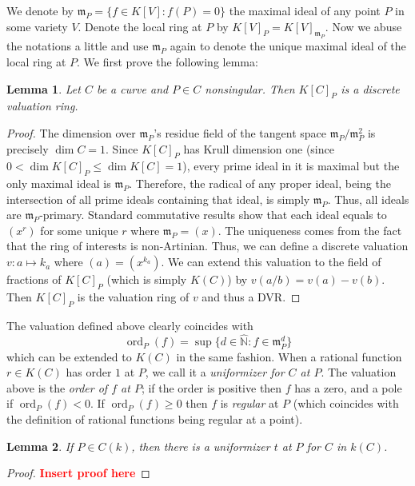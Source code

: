 \documentclass[12pt]{article}
\newtheorem{lemma}{Lemma}[subsection]
\theoremstyle{remark}
\newcommand{\ord}[0]{\operatorname{ord}}
\begin{document}
        We denote by $\mathfrak m_P=\{f\in K[V]:f(P)=0\}$ the maximal ideal of any point $P$ in some variety $V$. Denote the local ring at $P$ by $K[V]_P=K[V]_{\mathfrak m_P}$. Now we abuse the notations a little and use $\mathfrak m_P$ again to denote the unique maximal ideal of the local ring at $P$. We first prove the following lemma:
        \begin{lemma}
            Let $C$ be a curve and $P\in C$ nonsingular. Then $K[C]_P$ is a discrete valuation ring.
        \end{lemma}
        \begin{proof}
            The dimension over $\mathfrak m_P$'s residue field of the tangent space $\mathfrak m_P/\mathfrak m_P^2$ is precisely $\dim C=1$. Since $K[C]_P$ has Krull dimension one (since $0<\dim K[C]_P\leqslant \dim K[C]=1$), every prime ideal in it is maximal but the only maximal ideal is $\mathfrak m_P$. Therefore, the radical of any proper ideal, being the intersection of all prime ideals containing that ideal, is simply $\mathfrak m_P$. Thus, all ideals are $\mathfrak m_P$-primary. Standard commutative results show that each ideal equals to $(x^r)$ for some unique $r$ where $\mathfrak m_P=(x)$. The uniqueness comes from the fact that the ring of interests is non-Artinian. Thus, we can define a discrete valuation $v:a\mapsto k_a$ where $(a)=(x^{k_a})$. We can extend this valuation to the field of fractions of $K[C]_P$ (which is simply $K(C)$) by $v(a/b)=v(a)-v(b)$. Then $K[C]_P$ is the valuation ring of $v$ and thus a DVR.
        \end{proof}
        The valuation defined above clearly coincides with
        \[\ord_P(f)=\sup \{d\in\hat{\mathbb N}:f\in \mathfrak m_P^d\}\]
        which can be extended to $K(C)$ in the same fashion. When a rational function $r\in K(C)$ has order $1$ at $P$, we call it a \textit{uniformizer for $C$ at $P$}. The valuation above is the \textit{order of $f$ at $P$}; if the order is positive then $f$ has a zero, and a pole if $\ord_P(f)<0$. If $\ord_P(f)\geqslant 0$ then $f$ is \textit{regular} at $P$ (which coincides with the definition of rational functions being regular at a point).

        \begin{lemma}
            If $P\in C(k)$, then there is a uniformizer $t$ at $P$ for $C$ in $k(C)$.
        \end{lemma}
        \begin{proof}
            \textcolor{red}{\textbf{Insert proof here}}
        \end{proof}
        
\end{document}
